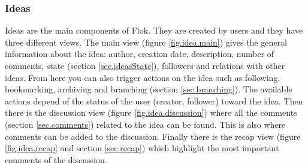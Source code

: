 \documentclass[a4paper,12pt,twoside]{article}
\begin{document}
\subsubsection{Ideas}
Ideas are the main components of Flok.
They are created by users and they have three different views.
The main view (figure \ref{fig.idea.main}) gives the general information about the idea: author, creation date, description, number of comments, state (section \ref{sec.ideasState}), followers and relations with other ideas.
From here you can also trigger actions on the idea such as following, bookmarking, archiving and branching (section \ref{sec.branching}).
The available actions depend of the status of the user (creator, follower) toward the idea.
Then there is the discussion view (figure \ref{fig.idea.discussion}) where all the comments (section \ref{sec.comments}) related to the idea can be found.
This is also where comments can be added to the discussion.
Finally there is the recap view (figure \ref{fig.idea.recap} and section \ref{sec.recap}) which highlight the most important comments of the discussion.
\end{document}
